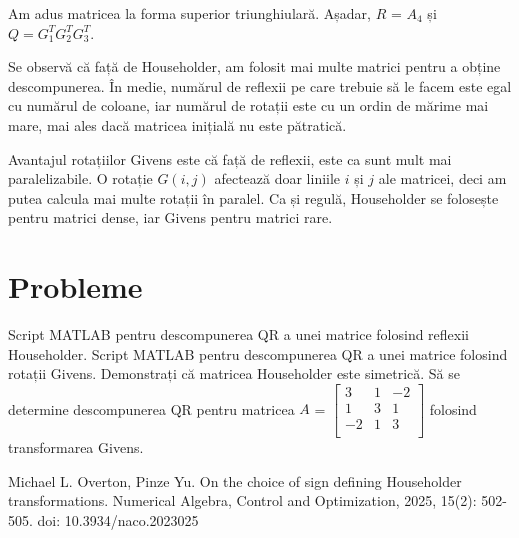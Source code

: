 \documentclass{exam}
\begin{document}
\par Am adus matricea la forma superior triunghiulară. Așadar, $R$ = $A_4$ și $Q = G_1^T G_2^T G_3^T$.

\par Se observă că față de Householder, am folosit mai multe matrici pentru a
obține descompunerea. În medie, numărul de reflexii pe care trebuie să le facem
este egal cu numărul de coloane, iar numărul de rotații este cu un ordin de
mărime mai mare, mai ales dacă matricea inițială nu este pătratică.

\par Avantajul rotațiilor Givens este că față de reflexii, este ca sunt mult mai
paralelizabile. O rotație $G(i, j)$ afectează doar liniile $i$ și $j$ ale
matricei, deci am putea calcula mai multe rotații în paralel. Ca și regulă,
Householder se folosește pentru matrici dense, iar Givens pentru matrici
rare.

\section{Probleme}

\begin{questions}
	\boxedpoints
	\pointsinmargin

	\question Script MATLAB pentru descompunerea QR a unei matrice folosind reflexii Householder.
	\question Script MATLAB pentru descompunerea QR a unei matrice folosind rotații Givens.
	\question Demonstrați că matricea Householder este simetrică.
	\question Să se determine descompunerea QR pentru matricea
	$A$ = $\begin{bmatrix}
			3  & 1 & -2 \\
			1  & 3 & 1  \\
			-2 & 1 & 3  \\
		\end{bmatrix}$ folosind transformarea Givens.
\end{questions}

\begin{thebibliography}{1}

	Michael L. Overton, Pinze Yu. On the choice of sign defining Householder transformations. Numerical Algebra, Control and Optimization, 2025, 15(2): 502-505. doi: 10.3934/naco.2023025

\end{thebibliography}
\end{document}
